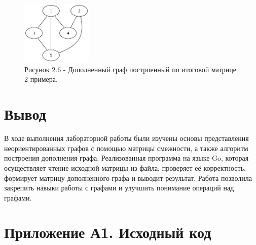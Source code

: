 \documentclass[oneside,a4paper,14pt]{extarticle}
\begin{document}
\begin{figure}[H]
	\centering
	\includegraphics[width=0.3\textwidth]{pics/complement_graph2.png}
	\caption*{Рисунок 2.6 - Дополненный граф построенный по итоговой матрице 2 примера.}
\end{figure}

\section*{Вывод}

В ходе выполнения лабораторной работы были изучены основы представления неориентированных графов с помощью матрицы смежности, а также алгоритм построения дополнения графа. Реализованная программа на языке Go, которая осуществляет чтение исходной матрицы из файла, проверяет её корректность, формирует матрицу дополненного графа и выводит результат. Работа позволила закрепить навыки работы с графами и улучшить понимание операций над графами.



\newpage
\section*{Приложение А1. Исходный код}
\inputminted{go}{code/main.go}
\end{document}
